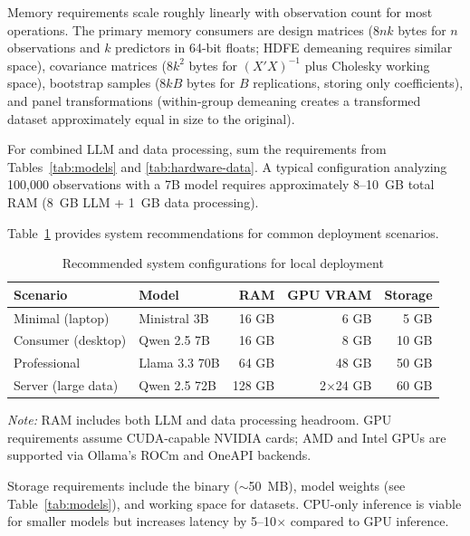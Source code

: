 Memory requirements scale roughly linearly with observation count for most
operations. The primary memory consumers are design matrices ($8nk$ bytes
for $n$ observations and $k$ predictors in 64-bit floats; HDFE demeaning
requires similar space), covariance matrices ($8k^2$ bytes for $(X'X)^{-1}$
plus Cholesky working space), bootstrap samples ($8kB$ bytes for $B$
replications, storing only coefficients), and panel transformations
(within-group demeaning creates a transformed dataset approximately equal
in size to the original).

For combined LLM and data processing, sum the requirements from
Tables~\ref{tab:models} and \ref{tab:hardware-data}. A typical configuration
analyzing 100,000 observations with a 7B model requires approximately
8--10~GB total RAM (8~GB LLM + 1~GB data processing).

Table~\ref{tab:hardware-summary} provides system recommendations for
common deployment scenarios.

\begin{table}[htbp]
\centering
\begin{threeparttable}
\caption{Recommended system configurations for local deployment}
\label{tab:hardware-summary}
\small
\begin{tabular}{llrrr}
\toprule
Scenario & Model & RAM & GPU VRAM & Storage \\
\midrule
Minimal (laptop) & Ministral 3B & 16 GB & 6 GB & 5 GB \\
Consumer (desktop) & Qwen 2.5 7B & 16 GB & 8 GB & 10 GB \\
Professional & Llama 3.3 70B & 64 GB & 48 GB & 50 GB \\
Server (large data) & Qwen 2.5 72B & 128 GB & 2$\times$24 GB & 60 GB \\
\bottomrule
\end{tabular}
\begin{tablenotes}\small
\item \emph{Note:} RAM includes both LLM and data processing headroom.
GPU requirements assume CUDA-capable NVIDIA cards; AMD and Intel GPUs
are supported via Ollama's ROCm and OneAPI backends.
\end{tablenotes}
\end{threeparttable}
\end{table}

Storage requirements include the  binary ($\sim$50~MB),
model weights (see Table~\ref{tab:models}), and working space for datasets.
CPU-only inference is viable for smaller models but increases latency by
5--10$\times$ compared to GPU inference.

